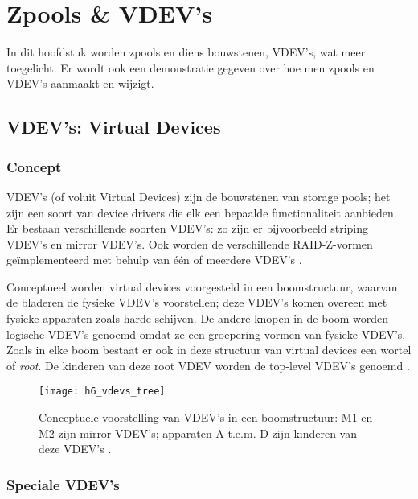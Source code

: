 

\chapter{Zpools \& VDEV's}
\label{ch:h6}

In dit hoofdstuk worden zpools en diens bouwstenen, VDEV's, wat meer toegelicht. Er wordt ook een demonstratie gegeven over hoe men zpools en VDEV's aanmaakt en wijzigt.

\section{VDEV's: Virtual Devices}

\subsection{Concept}

VDEV's (of voluit Virtual Devices) zijn de bouwstenen van storage pools; het zijn een soort van device drivers die elk een bepaalde functionaliteit aanbieden. Er bestaan verschillende soorten VDEV's: zo zijn er bijvoorbeeld \gls{striping} VDEV's en mirror VDEV's. Ook worden de verschillende RAID-Z-vormen geïmplementeerd met behulp van één of meerdere VDEV's \autocite{ZFSBonwick}.

Conceptueel worden virtual devices voorgesteld in een boomstructuur, waarvan de bladeren de fysieke VDEV's voorstellen; deze VDEV's komen overeen met fysieke apparaten zoals harde schijven. De andere knopen in de boom worden logische VDEV's genoemd omdat ze een groepering vormen van fysieke VDEV's. Zoals in elke boom bestaat er ook in deze structuur van virtual devices een wortel of \textit{root}. De kinderen van deze root VDEV worden de top-level VDEV's genoemd \autocite{Microsystems2006}.

\begin{figure}
  \centering
  \texttt{[image: h6\_vdevs\_tree]}
  \caption{Conceptuele voorstelling van VDEV's in een boomstructuur: M1 en M2 zijn mirror VDEV's; apparaten A t.e.m. D zijn kinderen van deze VDEV's \autocite{Microsystems2006}.}
  \label{fig:vdevs_boom}
\end{figure}

\subsection{Speciale VDEV's}

